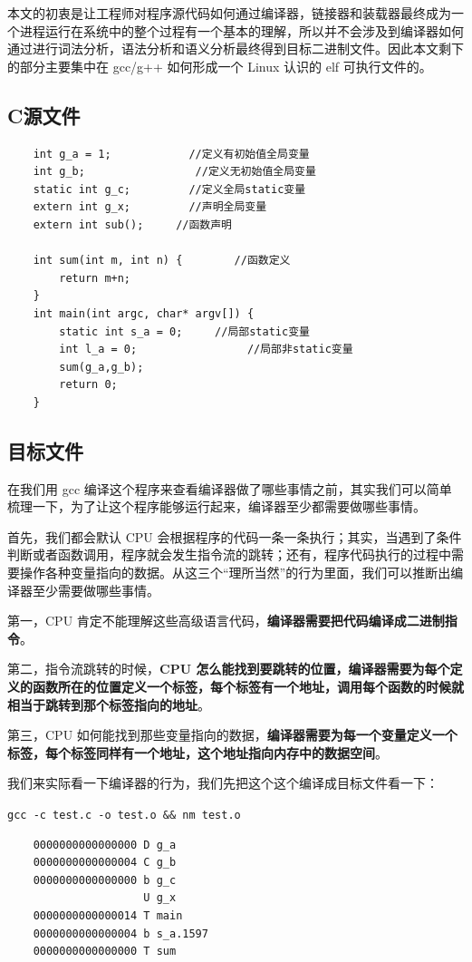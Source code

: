 \documentclass[UTF8,a4paper,12pt]{ctexbook}
\begin{document}
		本文的初衷是让工程师对程序源代码如何通过编译器，链接器和装载器最终成为一个进程运行在系统中的整个过程有一个基本的理解，所以并不会涉及到编译器如何通过进行词法分析，语法分析和语义分析最终得到目标二进制文件。因此本文剩下的部分主要集中在 gcc/g++ 如何形成一个 Linux 认识的 elf 可执行文件的。
	
			\subsection{C源文件}
				\begin{lstlisting}
	int g_a = 1;            //定义有初始值全局变量
	int g_b;                 //定义无初始值全局变量
	static int g_c;         //定义全局static变量
	extern int g_x;         //声明全局变量
	extern int sub();     //函数声明
	
	int sum(int m, int n) {        //函数定义
		return m+n;
	}
	int main(int argc, char* argv[]) {
		static int s_a = 0;     //局部static变量
		int l_a = 0;                 //局部非static变量
		sum(g_a,g_b);
		return 0;
	}
				\end{lstlisting}
			
			\subsection{目标文件}
			
				在我们用 gcc 编译这个程序来查看编译器做了哪些事情之前，其实我们可以简单梳理一下，为了让这个程序能够运行起来，编译器至少都需要做哪些事情。
				
				首先，我们都会默认 CPU 会根据程序的代码一条一条执行；其实，当遇到了条件判断或者函数调用，程序就会发生指令流的跳转；还有，程序代码执行的过程中需要操作各种变量指向的数据。从这三个“理所当然”的行为里面，我们可以推断出编译器至少需要做哪些事情。
				
				第一，CPU 肯定不能理解这些高级语言代码，\textbf{编译器需要把代码编译成二进制指令}。 
				
				第二，指令流跳转的时候，\textbf{CPU 怎么能找到要跳转的位置，编译器需要为每个定义的函数所在的位置定义一个标签，每个标签有一个地址，调用每个函数的时候就相当于跳转到那个标签指向的地址}。 
				
				第三，CPU 如何能找到那些变量指向的数据，\textbf{编译器需要为每一个变量定义一个标签，每个标签同样有一个地址，这个地址指向内存中的数据空间}。
			
				我们来实际看一下编译器的行为，我们先把这个这个编译成目标文件看一下：
				
				\verb|gcc -c test.c -o test.o && nm test.o|
				\begin{lstlisting}
	0000000000000000 D g_a
	0000000000000004 C g_b
	0000000000000000 b g_c
					 U g_x
	0000000000000014 T main
	0000000000000004 b s_a.1597
	0000000000000000 T sum
				\end{lstlisting}
				
\end{document}
